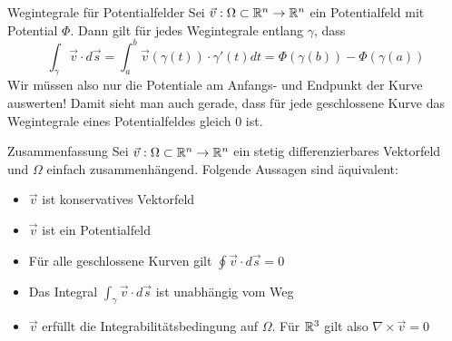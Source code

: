\begin{Satz}{Wegintegrale für Potentialfelder}{}
	Sei $\vec{v} : \Omega \subset \mathbb{R}^n \to \mathbb{R}^n$ ein Potentialfeld mit Potential $\Phi$. Dann gilt für jedes Wegintegrale entlang $\gamma$, dass
	\[
		\int_\gamma \vec{v} \cdot d\vec{s} = 
		\int_a^b \vec{v}(\gamma(t)) \cdot \gamma'(t) dt =
		\Phi(\gamma(b)) - \Phi(\gamma(a))
	\]
	Wir müssen also nur die Potentiale am Anfangs- und Endpunkt der Kurve auswerten! Damit sieht man auch gerade, dass für jede geschlossene Kurve das Wegintegrale eines Potentialfeldes gleich 0 ist. 
\end{Satz}

\begin{Diverses}{Zusammenfassung}{}
	Sei $\vec{v} : \Omega \subset \mathbb{R}^n \to \mathbb{R}^n$ ein stetig differenzierbares Vektorfeld und $\Omega$ einfach zusammenhängend. Folgende Aussagen sind äquivalent:
	\begin{itemize}
		\item $\vec{v}$ ist konservatives Vektorfeld
		\item $\vec{v}$ ist ein Potentialfeld
		\item Für alle geschlossene Kurven gilt $\oint \vec{v} \cdot d\vec{s} = 0$
		\item Das Integral $\int_\gamma \vec{v} \cdot d\vec{s}$ ist unabhängig vom Weg
		\item $\vec{v}$ erfüllt die Integrabilitätsbedingung auf $\Omega$. Für $\mathbb{R}^3$ gilt also $\nabla \times \vec{v} = 0$
	\end{itemize}
\end{Diverses}
